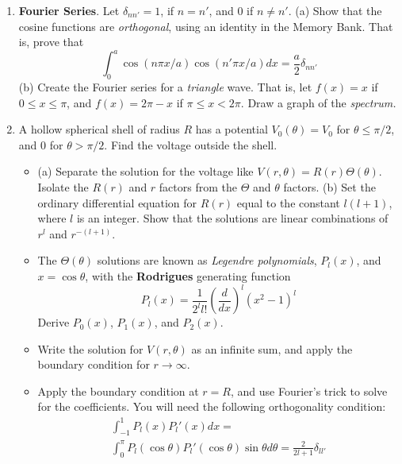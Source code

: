 \documentclass[10pt]{article}
\begin{document}
\begin{enumerate}
\item \textbf{Fourier Series}.  Let $\delta_{nn'} = 1$, if $n=n'$, and $0$ if $n\neq n'$.  (a) Show that the cosine functions are \textit{orthogonal}, using an identity in the Memory Bank.  That is, prove that 
\begin{equation}
\int_0^a \cos(n\pi x/a) \cos(n'\pi x/a) dx = \frac{a}{2} \delta_{nn'}
\end{equation}
(b) Create the Fourier series for a \textit{triangle} wave.  That is, let $f(x) = x$ if $0 \leq x \leq \pi$, and $f(x) = 2\pi-x$ if $\pi \leq x < 2\pi$.  Draw a graph of the \textit{spectrum.} \\ \vspace{5cm}
\item A hollow spherical shell of radius $R$ has a potential $V_0(\theta) = V_0$ for $\theta \leq \pi/2$, and $0$ for $\theta > \pi/2$.  Find the voltage outside the shell.
\begin{itemize}
\item (a) Separate the solution for the voltage like $V(r,\theta)=R(r)\Theta(\theta)$.  Isolate the $R(r)$ and $r$ factors from the $\Theta$ and $\theta$ factors. (b) Set the ordinary differential equation for $R(r)$ equal to the constant $l(l+1)$, where $l$ is an integer.  Show that the solutions are linear combinations of $r^l$ and $r^{-(l+1)}$. \\ \vspace{2.5cm}
\item The $\Theta(\theta)$ solutions are known as \textit{Legendre polynomials}, $P_l(x)$, and $x=\cos\theta$, with the \textbf{Rodrigues} generating function
\begin{equation}
P_l(x) = \frac{1}{2^ll!}\left(\frac{d}{dx}\right)^l(x^2-1)^l
\end{equation}
Derive $P_0(x)$, $P_1(x)$, and $P_2(x)$. \\ \vspace{1.5cm}
\item Write the solution for $V(r,\theta)$ as an infinite sum, and apply the boundary condition for $r\to\infty$. \\ \vspace{2cm}
\item Apply the boundary condition at $r=R$, and use Fourier's trick to solve for the coefficients.  You will need the following orthogonality condition:
\begin{multline}
\int_{-1}^{1} P_l(x) P_l'(x) dx = \\ \int_0^\pi P_l(\cos\theta)P_l'(\cos\theta)\sin\theta d\theta = \frac{2}{2l+1}\delta_{ll'}
\end{multline}
\end{itemize}
\end{enumerate}
\end{document}
